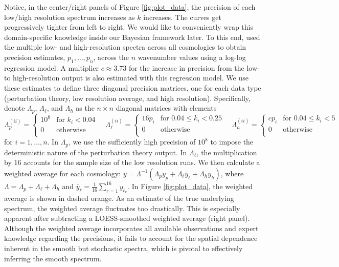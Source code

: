 \documentclass[11pt]{article}
\begin{document}
Notice, in the center/right panels of Figure \ref{fig:plot_data}, the precision of each
low/high resolution spectrum increases as $k$ increases.  The curves get progressively 
tighter from left to right.  We would like to conveniently wrap this domain-specific 
knowledge inside our Bayesian framework later.  To this end, \cite{moran2023mira} 
used the multiple low- and high-resolution spectra across all cosmologies to
obtain precision estimates, $p_1,\dots, p_n$, across the $n$ 
wavenumber values using a log-log regression model. A multiplier $c\approx 3.73$ for 
the increase in precision from the low- to high-resolution output is also 
estimated with this regression model. 
We use these estimates to define three 
diagonal precision matrices, one for each data type (perturbation theory, 
low resolution average, and high resolution). Specifically, denote $\Lambda_p$, 
$\Lambda_\ell$, and $\Lambda_h$ as the $n\times n$ diagonal matrices with elements
\begin{equation}\label{eq:lambda}
\Lambda_p^{(ii)} = \begin{cases}
    10^8 &\text{for } k_i < 0.04 \\
    0  &\text{otherwise}\\
    \end{cases}
\quad
\Lambda_\ell^{(ii)} = \begin{cases}
    16p_i &\text{for } 0.04 \leq k_i < 0.25 \\
    0  &\text{otherwise}\\
    \end{cases}
\quad
\Lambda_h^{(ii)} = \begin{cases}
    cp_i &\text{for } 0.04 \leq k_i < 5 \\
    0  &\text{otherwise}\\
    \end{cases}
\end{equation}
for $i=1,\dots, n$.  In $\Lambda_p$, we use the sufficiently high precision 
of $10^8$ to impose the deterministic nature of the perturbation theory output.
In $\Lambda_\ell$, the multiplication by 16 accounts for the sample size of the
low resolution runs.
We then calculate a weighted average for each cosmology: 
$\bar y = \Lambda^{-1}(\Lambda_p y_p + \Lambda_{\ell} \bar{y}_\ell + \Lambda_h y_h)$, 
where $\Lambda = \Lambda_p + \Lambda_\ell + \Lambda_h$ and 
$\bar{y}_\ell = \frac{1}{16}\sum_{r=1}^{16} y_{\ell_r}$. In Figure \ref{fig:plot_data},
the weighted average is shown in dashed orange.  As an estimate of the true
underlying spectrum, the weighted average fluctuates too drastically.  
This is especially apparent after subtracting a LOESS-smoothed weighted average (right panel).
Although the weighted average incorporates all available observations and 
expert knowledge regarding the precisions, it fails to account for the spatial 
dependence inherent in the smooth but stochastic spectra, which is pivotal to 
effectively inferring the smooth spectrum.
\end{document}
